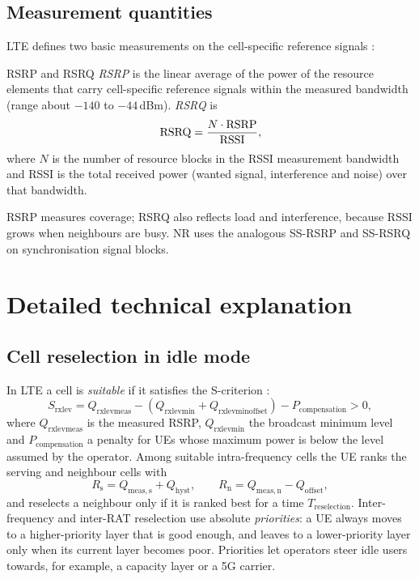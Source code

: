 \documentclass[11pt,a4paper]{article}
\begin{document}
\subsection{Measurement quantities}
LTE defines two basic measurements on the cell-specific reference signals
\cite{ts36300}:
\begin{definitionbox}{RSRP and RSRQ}
\emph{RSRP} is the linear average of the power of the resource elements that carry
cell-specific reference signals within the measured bandwidth (range about $-140$ to
$-44$\,dBm). \emph{RSRQ} is
\begin{equation}\label{eq:rsrq}
  \mathrm{RSRQ} = \frac{N\cdot\mathrm{RSRP}}{\mathrm{RSSI}},
\end{equation}
where $N$ is the number of resource blocks in the RSSI measurement bandwidth and RSSI is the total
received power (wanted signal, interference and noise) over that bandwidth.
\end{definitionbox}
RSRP measures coverage; RSRQ also reflects load and interference, because RSSI grows when
neighbours are busy. NR uses the analogous SS-RSRP and SS-RSRQ on synchronisation signal blocks.

\section{Detailed technical explanation}

\subsection{Cell reselection in idle mode}
In LTE a cell is \emph{suitable} if it satisfies the S-criterion \cite{ts36304}:
\begin{equation}\label{eq:scrit}
  S_{\mathrm{rxlev}} = Q_{\mathrm{rxlevmeas}} - (Q_{\mathrm{rxlevmin}} + Q_{\mathrm{rxlevminoffset}})
  - P_{\mathrm{compensation}} > 0 ,
\end{equation}
where $Q_{\mathrm{rxlevmeas}}$ is the measured RSRP, $Q_{\mathrm{rxlevmin}}$ the broadcast minimum
level and $P_{\mathrm{compensation}}$ a penalty for UEs whose maximum power is below the level
assumed by the operator. Among suitable intra-frequency cells the UE ranks the serving and
neighbour cells with
\begin{equation}\label{eq:rcrit}
  R_\mathrm{s} = Q_{\mathrm{meas,s}} + Q_{\mathrm{hyst}}, \qquad
  R_\mathrm{n} = Q_{\mathrm{meas,n}} - Q_{\mathrm{offset}},
\end{equation}
and reselects a neighbour only if it is ranked best for a time $T_{\mathrm{reselection}}$.
Inter-frequency and inter-RAT reselection use absolute \emph{priorities}: a UE always moves to a
higher-priority layer that is good enough, and leaves to a lower-priority layer only when its
current layer becomes poor. Priorities let operators steer idle users towards, for example, a
capacity layer or a 5G carrier.
\end{document}
